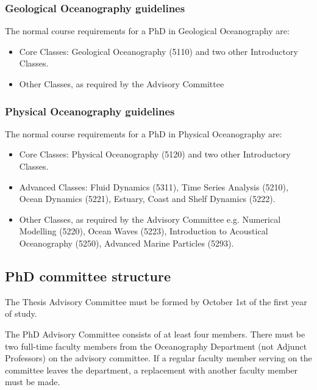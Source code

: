 \documentclass[12pt]{article}
\begin{document}
\subsubsection{Geological Oceanography guidelines}

The normal course requirements for a PhD in Geological Oceanography are:

\begin{itemize}
\item Core Classes: Geological Oceanography (5110) and two other Introductory Classes.
\item Other Classes, as required by the Advisory Committee
\end{itemize}

\subsubsection{Physical Oceanography guidelines}

The normal course requirements for a PhD in Physical Oceanography are:

\begin{itemize}
\item Core Classes: Physical Oceanography (5120) and two other Introductory Classes.
\item Advanced Classes: Fluid Dynamics (5311), Time Series Analysis (5210),
Ocean Dynamics (5221), Estuary, Coast and Shelf Dynamics (5222).
\item Other Classes, as required by the Advisory Committee e.g. Numerical
Modelling (5220), Ocean Waves (5223), Introduction to Acoustical Oceanography
(5250), Advanced Marine Particles (5293).
\end{itemize}

\subsection{PhD committee structure}

The Thesis Advisory Committee must be formed by October 1st of the first year
of study.

The PhD Advisory Committee consists of at least four members. There must be two
full-time faculty members from the Oceanography Department (not Adjunct
Professors) on the advisory committee. If a regular faculty member serving on
the committee leaves the department, a replacement with another faculty member
must be made.
\end{document}
